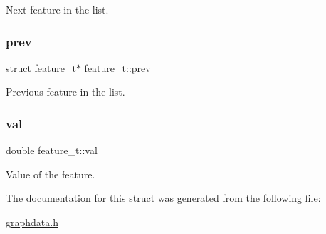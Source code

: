 Next feature in the list. \mbox{\label{structfeature__t_a58ef49f2333101b378c9301bd748c9ff}} 
\subsubsection{\texorpdfstring{prev}{prev}}
{\footnotesize\ttfamily struct \hyperlink{structfeature__t}{feature\+\_\+t}$\ast$ feature\+\_\+t\+::prev}

Previous feature in the list. \mbox{\label{structfeature__t_ad4881468d7929ea65cb2a3b96e8556da}} 
\subsubsection{\texorpdfstring{val}{val}}
{\footnotesize\ttfamily double feature\+\_\+t\+::val}

Value of the feature. 

The documentation for this struct was generated from the following file\+:\begin{DoxyCompactItemize}
\item 
\hyperlink{graphdata_8h}{graphdata.\+h}\end{DoxyCompactItemize}
